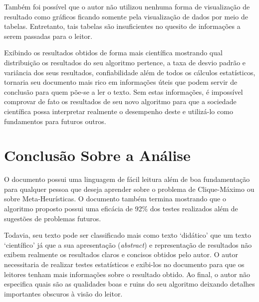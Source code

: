 \documentclass[portugues, brazil, a4paper,12pt]{article}
\begin{document}
	Também foi possível que o autor não utilizou nenhuma forma de visualização de resultado como gráficos ficando somente pela visualização de dados por meio de tabelas. Entretanto, tais tabelas são insuficientes no quesito de informações a serem passadas para o leitor.
	
	Exibindo os resultados obtidos de forma mais científica mostrando qual distribuição os resultados do seu algoritmo pertence, a taxa de desvio padrão e variância dos seus resultados, confiabilidade além de todos os cálculos estatísticos, tornaria seu documento mais rico em informações úteis que podem servir de conclusão para quem põe-se a ler o texto. Sem estas informações, é impossível comprovar de fato os resultados de seu novo algoritmo para que a sociedade científica possa interpretar realmente o desempenho deste e utilizá-lo como fundamentos para futuros outros.
	
	
\section{Conclusão Sobre a Análise}
	O documento possui uma linguagem de fácil leitura além de boa fundamentação para qualquer pessoa que deseja aprender sobre o problema de Clique-Máximo ou sobre Meta-Heurísticas. O documento também termina mostrando que o algoritmo proposto possui uma eficácia de 92\% dos testes realizados além de sugestões de problemas futuros.
	
	Todavia, seu texto pode ser classificado mais como texto `didático' que um texto `científico' já que a sua apresentação (\textit{abstract}) e representação de resultados não exibem realmente os resultados claros e concisos obtidos pelo autor. O autor necessitaria de realizar testes estatísticos e exibi-los no documento para que os leitores tenham mais informações sobre o resultado obtido. Ao final, o autor não especifica quais são as qualidades boas e ruins do seu algoritmo deixando detalhes importantes obscuros à visão do leitor.
\end{document}
